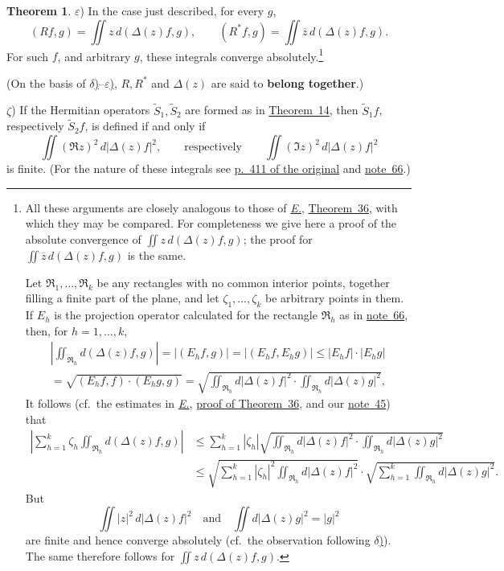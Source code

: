 \documentclass[
  paper=b5,
  twoside=true,
  fontsize=13pt,
  headings=normal,
  bookmarkpackage=false
]{scrartcl}
\theoremstyle{definition}
\newtheorem{theorem}{Theorem}
\newcommand{\NoteRef}[1]{\hyperref[fn:#1]{note~#1}}
\newcommand{\TheoremRef}[1]{\hyperref[thm:#1]{Theorem~#1}}
\newcommand{\Eref}{\hyperref[fn:E-paper]{\emph{E.}}}
\newcommand{\ErefText}[1]{\href{https://doi.org/10.1007/BF01782338}{#1}}
\begin{document}
\begin{theorem}
\label{thm:17:epsilon}%
\(\varepsilon\)) In the case just described, for every \(g\),
\[
  (Rf,g)=\iint z\,d(\Delta(z)f,g),\qquad
  (R^*f,g)=\iint\overline z\,d(\Delta(z)f,g).
\]
For such \(f\), and arbitrary \(g\), these integrals converge
absolutely.\footnote{\label{fn:67}All these arguments are closely analogous to those
of \Eref, \ErefText{Theorem~36}, with which they may be compared.  For
completeness we give here a proof of the absolute convergence of
\(\iint z\,d(\Delta(z)f,g)\); the proof for
\(\iint\overline z\,d(\Delta(z)f,g)\) is the same.

Let \(\mathfrak R_1,\ldots,\mathfrak R_k\) be any rectangles with no
common interior points, together filling a finite part of the plane,
and let \(\zeta_1,\ldots,\zeta_k\) be arbitrary points in them.  If
\(E_h\) is the projection operator calculated for the rectangle
\(\mathfrak R_h\) as in \NoteRef{66}, then, for \(h=1,\ldots,k\),
\begin{multline*}
 \left|\iint_{\mathfrak R_h}d(\Delta(z)f,g)\right|
 =\lvert(E_hf,g)\rvert=\lvert(E_hf,E_hg)\rvert
 \leq\lvert E_hf\rvert\cdot\lvert E_hg\rvert\\
 =\sqrt{(E_hf,f)\cdot(E_hg,g)}
 =\sqrt{
   \iint_{\mathfrak R_h}d\lvert\Delta(z)f\rvert^2\cdot
   \iint_{\mathfrak R_h}d\lvert\Delta(z)g\rvert^2},
\end{multline*}
It follows (cf.\ the estimates in \Eref, \ErefText{proof of Theorem~36}, and
our \NoteRef{45}) that
\[
\begin{aligned}
 \left|\sum_{h=1}^k\zeta_h
   \iint_{\mathfrak R_h}d(\Delta(z)f,g)\right|
 &\leq
 \sum_{h=1}^k|\zeta_h|
 \sqrt{
   \iint_{\mathfrak R_h}d|\Delta(z)f|^2\cdot
   \iint_{\mathfrak R_h}d|\Delta(z)g|^2}\\
 &\leq
 \sqrt{\sum_{h=1}^k|\zeta_h|^2
   \iint_{\mathfrak R_h}d|\Delta(z)f|^2}\cdot
 \sqrt{\sum_{h=1}^k
   \iint_{\mathfrak R_h}d|\Delta(z)g|^2}.
\end{aligned}
\]
But
\[
  \iint|z|^2\,d|\Delta(z)f|^2
  \quad\text{and}\quad
  \iint d|\Delta(z)g|^2=|g|^2
\]
are finite and hence converge absolutely (cf.\ the observation following
\hyperref[thm:17:delta]{\(\delta\))}).  The same therefore follows for
\(\iint z\,d(\Delta(z)f,g)\).}

(On the basis of \hyperref[thm:17:delta]{\(\delta\))}--\hyperref[thm:17:epsilon]{\(\varepsilon\))}, \(R,R^*\) and
\(\Delta(z)\) are said to \textbf{belong together}.)

\label{thm:17:zeta}%
\(\zeta\)) If the Hermitian operators
\(\widetilde S_1,\widetilde S_2\) are formed as in
\TheoremRef{14}, then \(\widetilde S_1f\), respectively
\(\widetilde S_2f\), is defined if and only if
\[
  \iint(\Re z)^2\,
  d|\Delta(z)f|^2,
  \qquad\text{respectively}\qquad
  \iint(\Im z)^2\,
  d|\Delta(z)f|^2
\]
is finite.  (For the nature of these integrals see
\hyperref[thm:17:delta]{p.~411 of the original} and
\NoteRef{66}.)


\end{theorem}
\end{document}
